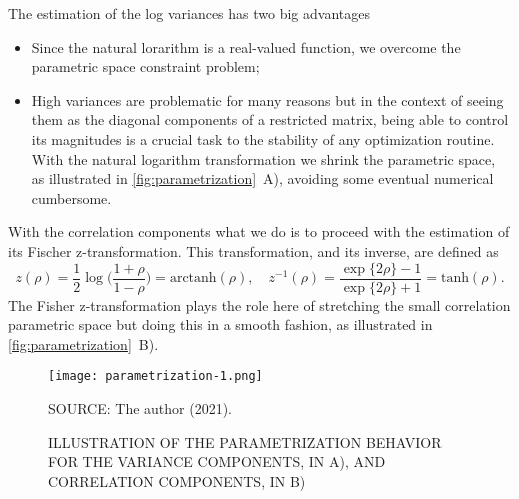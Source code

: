 The estimation of the log variances has two big advantages
\begin{itemize}
 \item Since the natural lorarithm is a real-valued function, we
       overcome the parametric space constraint problem;
 \item High variances are problematic for many reasons but in the
       context of seeing them as the diagonal components of a restricted
       matrix, being able to control its magnitudes is a crucial task to
       the stability of any optimization routine. With the natural
       logarithm transformation we shrink the parametric space, as
       illustrated in \autoref{fig:parametrization}~A), avoiding some
       eventual numerical cumbersome.
\end{itemize}
With the correlation components what we do is to proceed with the
estimation of its Fischer z-transformation. This transformation, and its
inverse, are defined as
\[
 z(\rho) = \frac{1}{2}\log\Big(\frac{1+\rho}{1-\rho}\Big)
         = \text{arctanh}(\rho),\quad
 z^{-1}(\rho) = \frac{\exp\{2\rho\}-1}{\exp\{2\rho\}+1}
             = \text{tanh}(\rho).
\]
The Fisher z-transformation plays the role here of stretching the small
correlation parametric space but doing this in a smooth fashion, as
illustrated in \autoref{fig:parametrization}~B).

\begin{figure}[H]
 \setlength{\abovecaptionskip}{.0001pt}
 \caption{ILLUSTRATION OF THE PARAMETRIZATION BEHAVIOR FOR THE VARIANCE
          COMPONENTS, IN A), AND CORRELATION COMPONENTS, IN B)}
 \vspace{0.3cm}\centering
 \texttt{[image: parametrization-1.png]}
 \\
 \vspace{0.1cm}
 \begin{footnotesize}
  SOURCE: The author (2021).
 \end{footnotesize}
 \label{fig:parametrization}
\end{figure}

